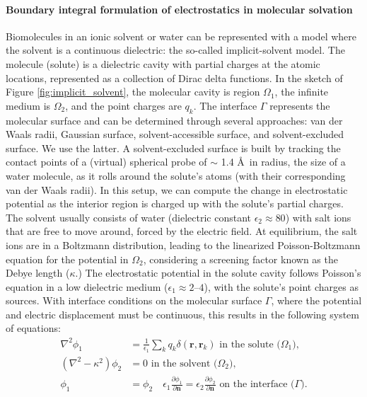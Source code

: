 \paragraph{Boundary integral formulation of electrostatics in molecular solvation}\label{s:formulation}

Biomolecules in an ionic solvent or water can be represented with a model where the solvent is a continuous dielectric: the so-called implicit-solvent model.
The molecule (solute) is a dielectric cavity with partial charges at the atomic locations,  represented as a collection of Dirac delta functions.
In  the sketch of Figure \ref{fig:implicit_solvent}, the molecular cavity is region $\Omega_1$, the infinite medium  is $\Omega_2$, and the point charges are $q_k$.
The interface $\Gamma$ represents the molecular surface and can be determined through several approaches: van der Waals radii, Gaussian surface, solvent-accessible surface, and solvent-excluded surface. 
We use the latter.
A solvent-excluded surface is built by tracking the contact points of a (virtual) spherical probe of  $\sim$ 1.4 \AA\ in radius, the size of a water molecule, as it rolls around the solute's atoms (with their corresponding van der Waals radii). 
In this setup, we can compute the change in electrostatic potential as the interior region is charged up with the solute's partial charges.
The solvent usually consists of water (dielectric constant $\epsilon_2\approx80$) with salt ions that are free to move around, forced by the electric field. 
At equilibrium, the salt ions are in a Boltzmann distribution, leading to the linearized Poisson-Boltzmann equation for the potential in $\Omega_2$, considering a screening factor known as the Debye length ($\kappa$.) 
The electrostatic potential in the solute cavity follows Poisson's equation in a low dielectric medium ($\epsilon_1\approx2\textrm{--}4$), with the solute's point charges as sources.
With interface conditions on the molecular surface $\Gamma$, where the potential and electric displacement must be continuous, this results in the following system of equations:
%
\begin{align} \label{eq:pde}
\nabla^2\phi_1 &= \frac{1}{\epsilon_1}\sum_k q_k\delta(\mathbf{r},\mathbf{r}_k) \text{ in the solute ($\Omega_1$),}\nonumber\\
(\nabla^2-\kappa^2)\phi_2 &= 0 \text{ in the solvent ($\Omega_2$),}\nonumber\\
\phi_1 &= \phi_2 \quad \epsilon_1\frac{\partial \phi_1}{\partial\mathbf{n}} = \epsilon_2\frac{\partial \phi_2}{\partial\mathbf{n}} \text{ on the interface ($\Gamma$)}.
\end{align}
%

